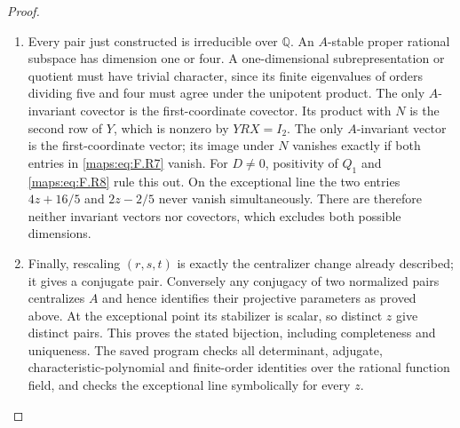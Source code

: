 \begin{proof}
\begin{enumerate}[label=\arabic*.]
\item Every pair just constructed is irreducible over $\mathbb Q$.
An $A$-stable proper rational subspace has dimension one or
four.  A one-dimensional subrepresentation or quotient must
have trivial character, since its finite eigenvalues of
orders dividing five and four must agree under the
unipotent product.  The only $A$-invariant covector is the
first-coordinate covector.  Its product with $N$ is the
second row of $Y$, which is nonzero by $YRX=I_2$.
The only $A$-invariant vector is the first-coordinate vector;
its image under $N$ vanishes exactly if both entries in
\eqref{maps:eq:F.R7} vanish.  For $D\ne0$, positivity of $Q_1$ and
\eqref{maps:eq:F.R8} rule this out.  On the exceptional line the two
entries $4z+16/5$ and $2z-2/5$ never vanish simultaneously.
There are therefore neither invariant vectors nor covectors,
which excludes both possible dimensions.

\item Finally, rescaling $(r,s,t)$ is exactly the centralizer
change already described; it gives a conjugate pair.
Conversely any conjugacy of two normalized pairs centralizes
$A$ and hence identifies their projective parameters as proved
above.  At the exceptional point its stabilizer is scalar,
so distinct $z$ give distinct pairs.  This proves the stated
bijection, including completeness and uniqueness.
The saved program checks all determinant, adjugate,
characteristic-polynomial and finite-order identities over
the rational function field, and checks the exceptional
line symbolically for every $z$.

\end{enumerate}
\end{proof}





